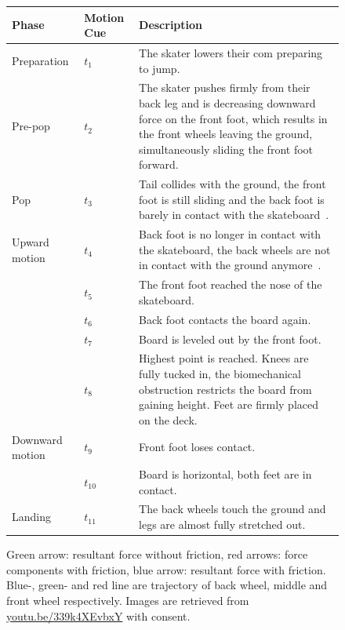 \documentclass[default,iicol]{sn-jnl}
\begin{document}
\begin{figure}[!t]
  \captionsetup{singlelinecheck=off}
\footnotesize
    \begin{center}
    \begin{tabular}{p{1.4cm} p{0.75cm} p{12.5cm}}
        \toprule
        Phase & Motion Cue & Description \\
        \midrule
        Preparation     & $t_1$ & The skater lowers their \gls{com} preparing to jump. \\
        Pre-pop         & $t_2$ & The skater pushes firmly from their back leg and is decreasing downward force on the front foot, which results in the front wheels leaving the ground, simultaneously sliding the front foot forward. \\
        Pop             & $t_3$ & Tail collides with the ground, the front foot is still sliding and the back foot is barely in contact with the skateboard~\cite{determan_kinetics_2006,nakashima_simulation_2021}. \\
        Upward motion   & $t_4$ & Back foot is no longer in contact with the skateboard, the back wheels are not in contact with the ground anymore~\cite{determan_kinetics_2006,nakashima_simulation_2021}. \\
                        & $t_5$ & The front foot reached the nose of the skateboard. \\
                        & $t_6$ & Back foot contacts the board again. \\
                        & $t_7$ & Board is leveled out by the front foot. \\
                        & $t_8$ & Highest point is reached. Knees are fully tucked in, the biomechanical obstruction restricts the board from gaining height. Feet are firmly placed on the deck. \\
        Downward motion & $t_9$ & Front foot loses contact. \\
                        & $t_{10}$& Board is horizontal, both feet are in contact. \\
        Landing         & $t_{11}$& The back wheels touch the ground and legs are almost fully stretched out. \\
        \bottomrule
    \end{tabular}
    \end{center}
 \caption[Ollie motion cues]{
    Green arrow: resultant force without friction, red arrows: force components
    with friction, blue arrow: resultant force with friction. Blue-, green- and
    red line are trajectory of back wheel, middle and front wheel respectively. Images are retrieved from \url{youtu.be/339k4XEvbxY} with consent.
  }
  \label{fig:ollie steps}
\end{figure}
\end{document}
